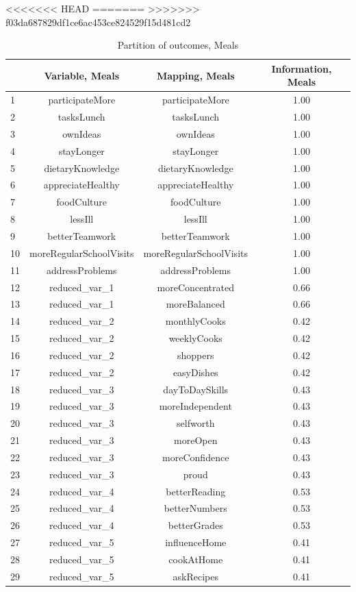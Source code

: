 \documentclass[12pt, a4paper, titlepage]{article}\usepackage[]{graphicx}\usepackage[]{color}
\begin{document}
<<<<<<< HEAD
=======
>>>>>>> f03da687829df1ce6ac453ce824529f15d481cd2
\begin{table}[ht]
\centering
\begin{tabular}{lccc}
  \hline
 & Variable, Meals & Mapping, Meals & Information, Meals \\ 
  \hline
1 & participateMore & participateMore & 1.00 \\ 
  2 & tasksLunch & tasksLunch & 1.00 \\ 
  3 & ownIdeas & ownIdeas & 1.00 \\ 
  4 & stayLonger & stayLonger & 1.00 \\ 
  5 & dietaryKnowledge & dietaryKnowledge & 1.00 \\ 
  6 & appreciateHealthy & appreciateHealthy & 1.00 \\ 
  7 & foodCulture & foodCulture & 1.00 \\ 
  8 & lessIll & lessIll & 1.00 \\ 
  9 & betterTeamwork & betterTeamwork & 1.00 \\ 
  10 & moreRegularSchoolVisits & moreRegularSchoolVisits & 1.00 \\ 
  11 & addressProblems & addressProblems & 1.00 \\ 
  12 & reduced\_var\_1 & moreConcentrated & 0.66 \\ 
  13 & reduced\_var\_1 & moreBalanced & 0.66 \\ 
  14 & reduced\_var\_2 & monthlyCooks & 0.42 \\ 
  15 & reduced\_var\_2 & weeklyCooks & 0.42 \\ 
  16 & reduced\_var\_2 & shoppers & 0.42 \\ 
  17 & reduced\_var\_2 & easyDishes & 0.42 \\ 
  18 & reduced\_var\_3 & dayToDaySkills & 0.43 \\ 
  19 & reduced\_var\_3 & moreIndependent & 0.43 \\ 
  20 & reduced\_var\_3 & selfworth & 0.43 \\ 
  21 & reduced\_var\_3 & moreOpen & 0.43 \\ 
  22 & reduced\_var\_3 & moreConfidence & 0.43 \\ 
  23 & reduced\_var\_3 & proud & 0.43 \\ 
  24 & reduced\_var\_4 & betterReading & 0.53 \\ 
  25 & reduced\_var\_4 & betterNumbers & 0.53 \\ 
  26 & reduced\_var\_4 & betterGrades & 0.53 \\ 
  27 & reduced\_var\_5 & influenceHome & 0.41 \\ 
  28 & reduced\_var\_5 & cookAtHome & 0.41 \\ 
  29 & reduced\_var\_5 & askRecipes & 0.41 \\ 
   \hline
\end{tabular}
\caption{Partition of outcomes, Meals} 
\label{partitionmeals}
\end{table}
\end{document}
